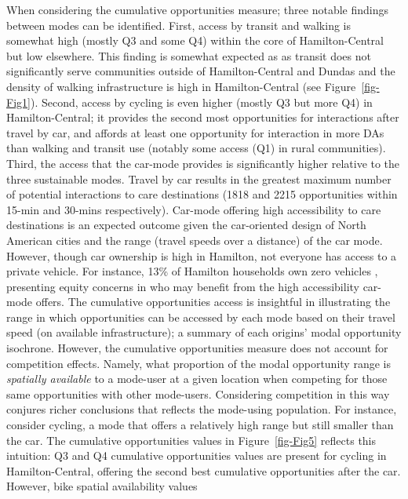 \documentclass[
  authoryear,
  preprint,
  3p]{elsarticle}
\begin{document}
When considering the cumulative opportunities measure; three notable
findings between modes can be identified. First, access by transit and
walking is somewhat high (mostly Q3 and some Q4) within the core of
Hamilton-Central but low elsewhere. This finding is somewhat expected as
as transit does not significantly serve communities outside of
Hamilton-Central and Dundas and the density of walking infrastructure is
high in Hamilton-Central (see Figure~\ref{fig-Fig1}). Second, access by
cycling is even higher (mostly Q3 but more Q4) in Hamilton-Central; it
provides the second most opportunities for interactions after travel by
car, and affords at least one opportunity for interaction in more DAs
than walking and transit use (notably some access (Q1) in rural
communities). Third, the access that the car-mode provides is
significantly higher relative to the three sustainable modes. Travel by
car results in the greatest maximum number of potential interactions to
care destinations (1818 and 2215 opportunities within 15-min and 30-mins
respectively). Car-mode offering high accessibility to care destinations
is an expected outcome given the car-oriented design of North American
cities \citep{saeidizandRevisitingCarDependency2022} and the range
(travel speeds over a distance) of the car mode. However, though car
ownership is high in Hamilton, not everyone has access to a private
vehicle. For instance, 13\% of Hamilton households own zero vehicles
\citep{datamanagementgroupTTSTransportationTomorrow2018}, presenting
equity concerns in who may benefit from the high accessibility car-mode
offers. The cumulative opportunities access is insightful in
illustrating the range in which opportunities can be accessed by each
mode based on their travel speed (on available infrastructure); a
summary of each origins' modal opportunity isochrone. However, the
cumulative opportunities measure does not account for competition
effects. Namely, what proportion of the modal opportunity range is
\emph{spatially available} to a mode-user at a given location when
competing for those same opportunities with other mode-users.
Considering competition in this way conjures richer conclusions that
reflects the mode-using population. For instance, consider cycling, a
mode that offers a relatively high range but still smaller than the car.
The cumulative opportunities values in Figure~\ref{fig-Fig5} reflects
this intuition: Q3 and Q4 cumulative opportunities values are present
for cycling in Hamilton-Central, offering the second best cumulative
opportunities after the car. However, bike spatial availability values
\end{document}
